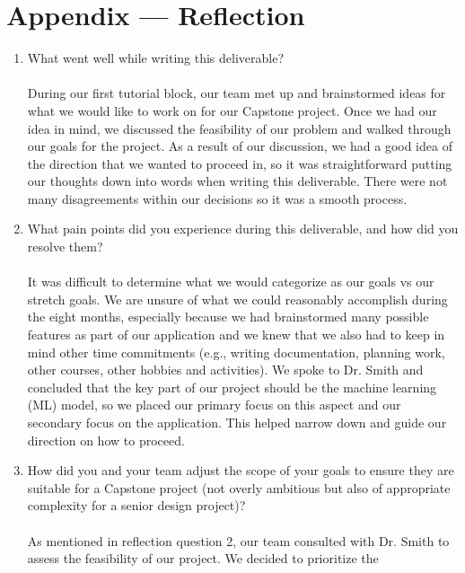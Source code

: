 \documentclass{article}
\begin{document}
\newpage{}

\section*{Appendix --- Reflection}

\begin{enumerate}
    \item What went well while writing this deliverable? \\ \\
        During our first tutorial block, our team met up and brainstormed ideas
        for what we would like to work on for our Capstone project. Once we had
        our idea in mind, we discussed the feasibility of our problem and walked
        through our goals for the project. As a result of our discussion, we had
        a good idea of the direction that we wanted to proceed in, so it was
        straightforward putting our thoughts down into words when writing this
        deliverable. There were not many disagreements within our decisions so
        it was a smooth process.
    \item What pain points did you experience during this deliverable, and how
    did you resolve them? \\ \\
        It was difficult to determine what we would categorize as our goals vs
        our stretch goals. We are unsure of what we could reasonably accomplish
        during the eight months, especially because we had brainstormed many
        possible features as part of our application and we knew that we also
        had to keep in mind other time commitments (e.g., writing documentation,
        planning work, other courses, other hobbies and activities). We spoke to
        Dr. Smith and concluded that the key part of our project should be the
        machine learning (ML) model, so we placed our primary focus on this
        aspect and our secondary focus on the application. This helped narrow
        down and guide our direction on how to proceed.
    \item How did you and your team adjust the scope of your goals to ensure
    they are suitable for a Capstone project (not overly ambitious but also of
    appropriate complexity for a senior design project)? \\ \\ 
        As mentioned in reflection question 2, our team consulted with Dr. Smith
        to assess the feasibility of our project. We decided to prioritize the

\end{enumerate}
\end{document}
